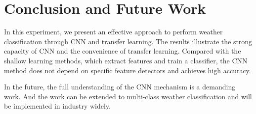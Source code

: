 \section{Conclusion and Future Work}

In this experiment, we present an effective approach to perform weather classification through CNN and transfer learning. The results illustrate the strong capacity of CNN and the convenience of transfer learning. Compared with the shallow learning methods, which extract features and train a classifier, the CNN method does not depend on specific feature detectors and achieves high accuracy. 

In the future, the full understanding of the CNN mechanism is a demanding work. And the work can be extended to multi-class weather classification and will be implemented in industry widely.